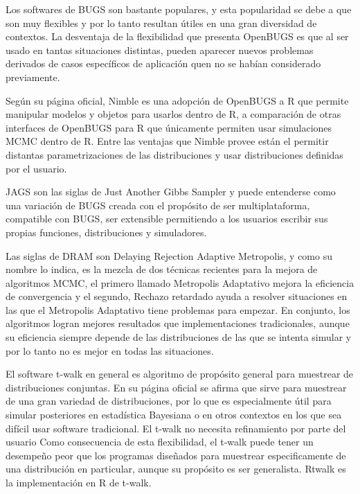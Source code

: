 \documentclass{article}
\begin{document}
\begin{enumerate}
    Los softwares de BUGS son bastante populares, y esta popularidad se debe a que
    son muy flexibles y por lo tanto resultan útiles en una gran diversidad de 
    contextos. La desventaja de la flexibilidad que presenta OpenBUGS es que al
    ser usado en tantas situaciones distintas, pueden aparecer nuevos problemas
    derivados de casos específicos de aplicación quen no se habían considerado
    previamente.

    Según su página oficial, Nimble es una adopción de OpenBUGS a R que permite
    manipular modelos y objetos para usarlos dentro de R, a comparación de otras
    interfaces de OpenBUGS para R que únicamente permiten usar simulaciones MCMC
    dentro de R. Entre las ventajas que Nimble provee están el permitir distantas 
    parametrizaciones de las distribuciones y usar distribuciones definidas por
    el usuario.

    JAGS son las siglas de Just Another Gibbs Sampler y puede entenderse como una
    variación de BUGS creada con el propósito de ser multiplataforma, compatible
    con BUGS, ser extensible permitiendo a los usuarios escribir sus propias 
    funciones, distribuciones y simuladores.

    Las siglas de DRAM son Delaying Rejection Adaptive Metropolis, y como su nombre
    lo indica, es la mezcla de dos técnicas recientes para la mejora de algoritmos
    MCMC, el primero llamado Metropolis Adaptativo mejora la eficiencia de convergencia 
    y el segundo, Rechazo retardado ayuda a resolver situaciones en las que el 
    Metropolis Adaptativo tiene problemas para empezar. En conjunto, los algoritmos
    logran mejores resultados que implementaciones tradicionales, aunque su eficiencia
    siempre depende de las distribuciones de las que se intenta simular y por lo tanto
    no es mejor en todas las situaciones.

    El software t-walk en general es algoritmo de propósito general para muestrear
    de distribuciones conjuntas. En su página oficial se afirma que sirve para muestrear
    de una gran variedad de distribuciones, por lo que es especialmente útil para
    simular posteriores en estadística Bayesiana o en otros contextos en los que sea
    difícil usar software tradicional. El t-walk no necesita refinamiento por parte
    del usuario
    Como consecuencia de esta flexibilidad, el t-walk puede tener un desempeño peor 
    que los programas diseñados para muestrear especificamente de una distribución 
    en particular, aunque su propósito es ser generalista. Rtwalk es la implementación
    en R de t-walk.


\end{enumerate}
\end{document}
